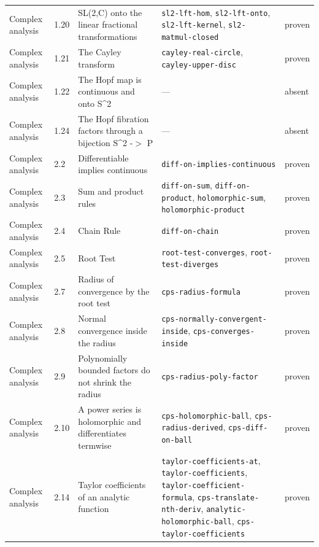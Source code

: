\begin{longtable}{@{}ll>{\raggedright\arraybackslash}p{4.2cm}>{\raggedright\arraybackslash}p{4.2cm}l@{}}
Complex analysis & 1.20 & SL(2,C) onto the linear fractional transformations & \texttt{sl2-\allowbreak{}lft-\allowbreak{}hom}, \texttt{sl2-\allowbreak{}lft-\allowbreak{}onto}, \texttt{sl2-\allowbreak{}lft-\allowbreak{}kernel}, \texttt{sl2-\allowbreak{}matmul-\allowbreak{}closed} & proven \\
Complex analysis & 1.21 & The Cayley transform & \texttt{cayley-\allowbreak{}real-\allowbreak{}circle}, \texttt{cayley-\allowbreak{}upper-\allowbreak{}disc} & proven \\
Complex analysis & 1.22 & The Hopf map is continuous and onto S\textasciicircum{}2 & --- & absent \\
Complex analysis & 1.24 & The Hopf fibration factors through a bijection S\textasciicircum{}2 -$>$ P & --- & absent \\
Complex analysis & 2.2 & Differentiable implies continuous & \texttt{diff-\allowbreak{}on-\allowbreak{}implies-\allowbreak{}continuous} & proven \\
Complex analysis & 2.3 & Sum and product rules & \texttt{diff-\allowbreak{}on-\allowbreak{}sum}, \texttt{diff-\allowbreak{}on-\allowbreak{}product}, \texttt{holomorphic-\allowbreak{}sum}, \texttt{holomorphic-\allowbreak{}product} & proven \\
Complex analysis & 2.4 & Chain Rule & \texttt{diff-\allowbreak{}on-\allowbreak{}chain} & proven \\
Complex analysis & 2.5 & Root Test & \texttt{root-\allowbreak{}test-\allowbreak{}converges}, \texttt{root-\allowbreak{}test-\allowbreak{}diverges} & proven \\
Complex analysis & 2.7 & Radius of convergence by the root test & \texttt{cps-\allowbreak{}radius-\allowbreak{}formula} & proven \\
Complex analysis & 2.8 & Normal convergence inside the radius & \texttt{cps-\allowbreak{}normally-\allowbreak{}convergent-\allowbreak{}inside}, \texttt{cps-\allowbreak{}converges-\allowbreak{}inside} & proven \\
Complex analysis & 2.9 & Polynomially bounded factors do not shrink the radius & \texttt{cps-\allowbreak{}radius-\allowbreak{}poly-\allowbreak{}factor} & proven \\
Complex analysis & 2.10 & A power series is holomorphic and differentiates termwise & \texttt{cps-\allowbreak{}holomorphic-\allowbreak{}ball}, \texttt{cps-\allowbreak{}radius-\allowbreak{}derived}, \texttt{cps-\allowbreak{}diff-\allowbreak{}on-\allowbreak{}ball} & proven \\
Complex analysis & 2.14 & Taylor coefficients of an analytic function & \texttt{taylor-\allowbreak{}coefficients-\allowbreak{}at}, \texttt{taylor-\allowbreak{}coefficients}, \texttt{taylor-\allowbreak{}coefficient-\allowbreak{}formula}, \texttt{cps-\allowbreak{}translate-\allowbreak{}nth-\allowbreak{}deriv}, \texttt{analytic-\allowbreak{}holomorphic-\allowbreak{}ball}, \texttt{cps-\allowbreak{}taylor-\allowbreak{}coefficients} & proven \\

\end{longtable}

